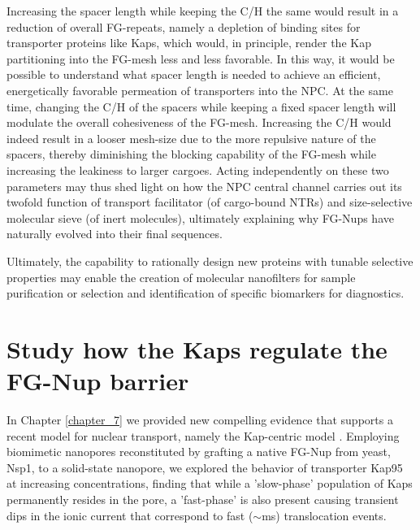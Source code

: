 \noindent Increasing the spacer length while keeping the C/H the same would result in a reduction of overall FG-repeats, namely a depletion of binding sites for transporter proteins like Kaps, which would, in principle, render the Kap partitioning into the FG-mesh less and less favorable. In this way, it would be possible to understand what spacer length is needed to achieve an efficient, energetically favorable permeation of transporters into the NPC. At the same time, changing the C/H of the spacers while keeping a fixed spacer length will modulate the overall cohesiveness of the FG-mesh. Increasing the C/H would indeed result in a looser mesh-size due to the more repulsive nature of the spacers, thereby diminishing the blocking capability of the FG-mesh while increasing the leakiness to larger cargoes. Acting independently on these two parameters may thus shed light on how the NPC central channel carries out its twofold function of transport facilitator (of cargo-bound NTRs) and size-selective molecular sieve (of inert molecules), ultimately explaining why FG-Nups have naturally evolved into their final sequences.

Ultimately, the capability to rationally design new proteins with tunable selective properties may enable the creation of molecular nanofilters for sample purification or selection and identification of specific biomarkers for diagnostics.

\section{Study how the Kaps regulate the FG-Nup barrier}
In Chapter \ref{chapter_7} we provided new compelling evidence that supports a recent model for nuclear transport, namely the Kap-centric model \cite{Lim2015}. Employing biomimetic nanopores reconstituted by grafting a native FG-Nup from yeast, Nsp1, to a solid-state nanopore, we explored the behavior of transporter Kap95 at increasing concentrations, finding that while a 'slow-phase' population of Kaps permanently resides in the pore, a 'fast-phase' is also present causing transient dips in the ionic current that correspond to fast ($\sim$ms) translocation events.

